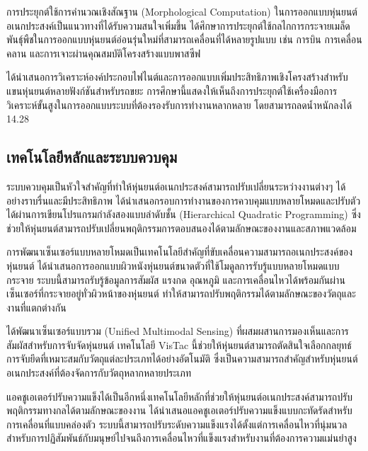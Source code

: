 \documentclass[a4paper]{article}
\begin{document}
การประยุกต์ใช้การคำนวณเชิงสัณฐาน (Morphological Computation) ในการออกแบบหุ่นยนต์อเนกประสงค์เป็นแนวทางที่ได้รับความสนใจเพิ่มขึ้น \textcite{sitti2021morphological} ได้ศึกษาการประยุกต์ใช้กลไกการกระจายเมล็ดพันธุ์พืชในการออกแบบหุ่นยนต์อ่อนรุ่นใหม่ที่สามารถเคลื่อนที่ได้หลายรูปแบบ เช่น การบิน การเคลื่อนคลาน และการเจาะผ่านคุณสมบัติโครงสร้างแบบพาสซีฟ

\textcite{li2025finite} ได้นำเสนอการวิเคราะห์องค์ประกอบไฟไนต์และการออกแบบเพิ่มประสิทธิภาพเชิงโครงสร้างสำหรับแขนหุ่นยนต์หลายฟังก์ชันสำหรับรถขยะ การศึกษานี้แสดงให้เห็นถึงการประยุกต์ใช้เครื่องมือการวิเคราะห์ขั้นสูงในการออกแบบระบบที่ต้องรองรับการทำงานหลากหลาย โดยสามารถลดน้ำหนักลงได้ 14.28%

\subsection{เทคโนโลยีหลักและระบบควบคุม}

ระบบควบคุมเป็นหัวใจสำคัญที่ทำให้หุ่นยนต์อเนกประสงค์สามารถปรับเปลี่ยนระหว่างงานต่างๆ ได้อย่างราบรื่นและมีประสิทธิภาพ \textcite{tassi2024multimodal} ได้นำเสนอกรอบการทำงานของการควบคุมแบบหลายโหมดและปรับตัวได้ผ่านการเขียนโปรแกรมกำลังสองแบบลำดับชั้น (Hierarchical Quadratic Programming) ซึ่งช่วยให้หุ่นยนต์สามารถปรับเปลี่ยนพฤติกรรมการตอบสนองได้ตามลักษณะของงานและสภาพแวดล้อม

การพัฒนาเซ็นเซอร์แบบหลายโหมดเป็นเทคโนโลยีสำคัญที่ขับเคลื่อนความสามารถอเนกประสงค์ของหุ่นยนต์ \textcite{yang2024body} ได้นำเสนอการออกแบบผิวหนังหุ่นยนต์ขนาดตัวที่ใช้โมดูลการรับรู้แบบหลายโหมดแบบกระจาย ระบบนี้สามารถรับรู้ข้อมูลการสัมผัส แรงกด อุณหภูมิ และการเคลื่อนไหวได้พร้อมกันผ่านเซ็นเซอร์ที่กระจายอยู่ทั่วผิวหน้าของหุ่นยนต์ ทำให้สามารถปรับพฤติกรรมได้ตามลักษณะของวัตถุและงานที่แตกต่างกัน

\textcite{athar2023vistac} ได้พัฒนาเซ็นเซอร์แบบรวม (Unified Multimodal Sensing) ที่ผสมผสานการมองเห็นและการสัมผัสสำหรับการจับจัดหุ่นยนต์ เทคโนโลยี VisTac นี้ช่วยให้หุ่นยนต์สามารถตัดสินใจเลือกกลยุทธ์การจับยึดที่เหมาะสมกับวัตถุแต่ละประเภทได้อย่างอัตโนมัติ ซึ่งเป็นความสามารถสำคัญสำหรับหุ่นยนต์อเนกประสงค์ที่ต้องจัดการกับวัตถุหลากหลายประเภท

แอคชูเอเตอร์ปรับความแข็งได้เป็นอีกหนึ่งเทคโนโลยีหลักที่ช่วยให้หุ่นยนต์อเนกประสงค์สามารถปรับพฤติกรรมทางกลได้ตามลักษณะของงาน \textcite{ieee2024compact} ได้นำเสนอแอคชูเอเตอร์ปรับความแข็งแบบกะทัดรัดสำหรับการเคลื่อนที่แบบคล่องตัว ระบบนี้สามารถปรับระดับความแข็งแรงได้ตั้งแต่การเคลื่อนไหวที่นุ่มนวลสำหรับการปฏิสัมพันธ์กับมนุษย์ไปจนถึงการเคลื่อนไหวที่แข็งแรงสำหรับงานที่ต้องการความแม่นยำสูง
\end{document}
